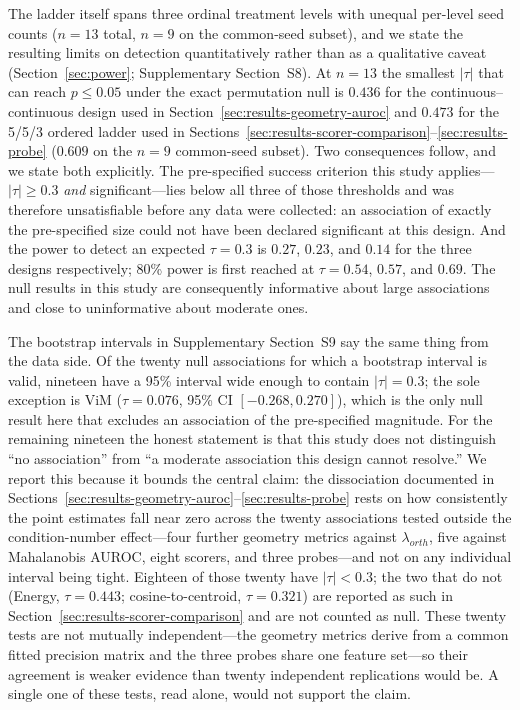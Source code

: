 The ladder itself spans three ordinal treatment levels with unequal per-level seed counts ($n=13$ total, $n=9$ on the common-seed subset), and we state the resulting limits on detection quantitatively rather than as a qualitative caveat (Section~\ref{sec:power}; Supplementary Section~S8). At $n=13$ the smallest $|\tau|$ that can reach $p\leq0.05$ under the exact permutation null is $0.436$ for the continuous--continuous design used in Section~\ref{sec:results-geometry-auroc} and $0.473$ for the 5/5/3 ordered ladder used in Sections~\ref{sec:results-scorer-comparison}--\ref{sec:results-probe} ($0.609$ on the $n=9$ common-seed subset). Two consequences follow, and we state both explicitly. The pre-specified success criterion this study applies---$|\tau|\geq0.3$ \emph{and} significant---lies below all three of those thresholds and was therefore unsatisfiable before any data were collected: an association of exactly the pre-specified size could not have been declared significant at this design. And the power to detect an expected $\tau=0.3$ is $0.27$, $0.23$, and $0.14$ for the three designs respectively; 80\% power is first reached at $\tau=0.54$, $0.57$, and $0.69$. The null results in this study are consequently informative about large associations and close to uninformative about moderate ones.

The bootstrap intervals in Supplementary Section~S9 say the same thing from the data side. Of the twenty null associations for which a bootstrap interval is valid, nineteen have a 95\% interval wide enough to contain $|\tau|=0.3$; the sole exception is ViM ($\tau=0.076$, 95\% CI $[-0.268,0.270]$), which is the only null result here that excludes an association of the pre-specified magnitude. For the remaining nineteen the honest statement is that this study does not distinguish ``no association'' from ``a moderate association this design cannot resolve.'' We report this because it bounds the central claim: the dissociation documented in Sections~\ref{sec:results-geometry-auroc}--\ref{sec:results-probe} rests on how consistently the point estimates fall near zero across the twenty associations tested outside the condition-number effect---four further geometry metrics against $\lambda_{orth}$, five against Mahalanobis AUROC, eight scorers, and three probes---and not on any individual interval being tight. Eighteen of those twenty have $|\tau|<0.3$; the two that do not (Energy, $\tau=0.443$; cosine-to-centroid, $\tau=0.321$) are reported as such in Section~\ref{sec:results-scorer-comparison} and are not counted as null. These twenty tests are not mutually independent---the geometry metrics derive from a common fitted precision matrix and the three probes share one feature set---so their agreement is weaker evidence than twenty independent replications would be. A single one of these tests, read alone, would not support the claim.

